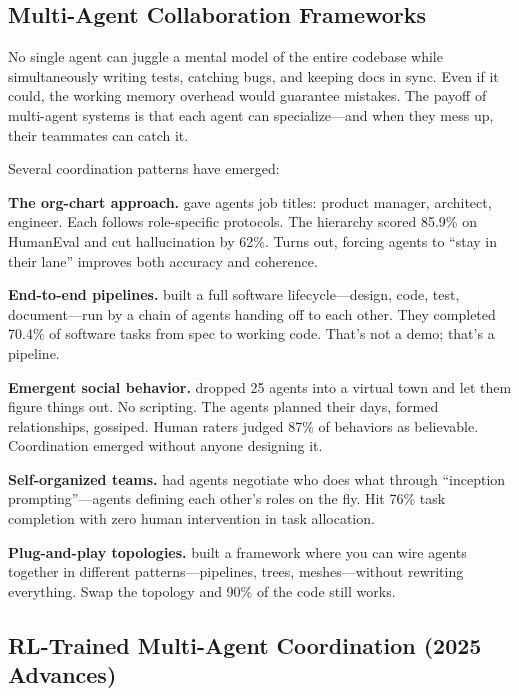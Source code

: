 \documentclass[12pt,a4paper]{report}
\theoremstyle{definition}
\begin{document}
\subsection{Multi-Agent Collaboration Frameworks}
\label{sec:multi_agent_collab}

No single agent can juggle a mental model of the entire codebase while simultaneously writing tests, catching bugs, and keeping docs in sync. Even if it could, the working memory overhead would guarantee mistakes. The payoff of multi-agent systems is that each agent can specialize---and when they mess up, their teammates can catch it.

Several coordination patterns have emerged:

\textbf{The org-chart approach.} \citet{hong2023metagpt} gave agents job titles: product manager, architect, engineer. Each follows role-specific protocols. The hierarchy scored 85.9\% on HumanEval and cut hallucination by 62\%. Turns out, forcing agents to ``stay in their lane'' improves both accuracy and coherence.

\textbf{End-to-end pipelines.} \citet{qian2023chatdev} built a full software lifecycle---design, code, test, document---run by a chain of agents handing off to each other. They completed 70.4\% of software tasks from spec to working code. That's not a demo; that's a pipeline.

\textbf{Emergent social behavior.} \citet{park2023generative} dropped 25 agents into a virtual town and let them figure things out. No scripting. The agents planned their days, formed relationships, gossiped. Human raters judged 87\% of behaviors as believable. Coordination emerged without anyone designing it.

\textbf{Self-organized teams.} \citet{li2023camel} had agents negotiate who does what through ``inception prompting''---agents defining each other's roles on the fly. Hit 76\% task completion with zero human intervention in task allocation.

\textbf{Plug-and-play topologies.} \citet{wu2023autogen} built a framework where you can wire agents together in different patterns---pipelines, trees, meshes---without rewriting everything. Swap the topology and 90\% of the code still works.

\subsection{RL-Trained Multi-Agent Coordination (2025 Advances)}
\label{sec:multi_agent_rl}
\end{document}
